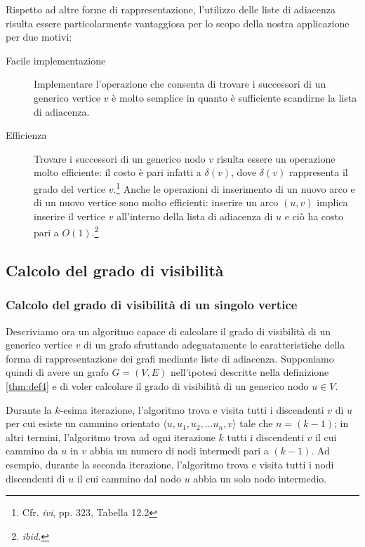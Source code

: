 \documentclass[10pt,a4paper,titlepage]{article}
\begin{document}
Rispetto ad altre forme di rappresentazione, l'utilizzo delle liste di adiacenza risulta essere particolarmente vantaggiosa per lo scopo della nostra applicazione per due motivi:

\begin{description}
\item[Facile implementazione] Implementare l'operazione che consenta di trovare i successori di un generico vertice $v$ è molto semplice in quanto è sufficiente scandirne la lista di adiacenza.

\item[Efficienza] Trovare i successori di un generico nodo $v$ risulta essere un operazione molto efficiente: il costo è pari infatti a $\delta(v)$, dove $\delta(v)$ rappresenta il grado del vertice $v$.\footnote{Cfr. \textit{ivi}, pp. 323, Tabella 12.2} Anche le operazioni di inserimento di un nuovo arco e di un nuovo vertice sono molto efficienti: inserire un arco $(u, v)$ implica inserire il vertice $v$ all'interno della lista di adiacenza di $u$ e ciò ha costo pari a $O(1)$.\footnote{\textit{ibid.}}
\end{description}

\subsection{Calcolo del grado di visibilità}

\subsubsection{Calcolo del grado di visibilità di un singolo vertice}

Descriviamo ora un algoritmo capace di calcolare il grado di visibilità di un generico vertice $v$ di un grafo sfruttando adeguatamente le caratteristiche della forma di rappresentazione dei grafi mediante liste di adiacenza. Supponiamo quindi di avere un grafo $G = (V, E)$ nell'ipotesi descritte nella definizione \ref{thm:def4} e di voler calcolare il grado di visibilità di un generico nodo $u \in V$. 

Durante la $k$-esima iterazione, l'algoritmo trova e visita tutti i discendenti $v$ di $u$ per cui esiste un cammino orientato $\langle u, u_1, u_2, ...u_n, v\rangle$ tale che $n=(k-1)$; in altri termini, l'algoritmo trova ad ogni iterazione $k$ tutti i discendenti $v$ il cui cammino da $u$ in $v$ abbia un numero di nodi intermedi pari a $(k-1)$. Ad esempio, durante la seconda iterazione, l'algoritmo trova e visita tutti i nodi discendenti di $u$ il cui cammino dal nodo $u$ abbia un solo nodo intermedio.
\end{document}
